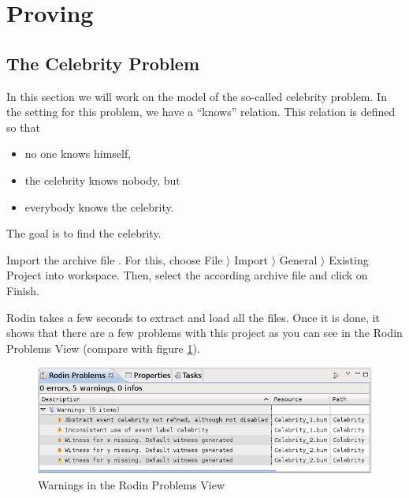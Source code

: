 \section{Proving}
\label{tutorial_08}


\subsection{The Celebrity Problem}

In this section we will work on the model of the so-called celebrity problem. In the setting for this problem, we have a ``knows'' relation. This relation is defined so that

\begin{itemize}
	\item no one knows himself,
	\item the celebrity knows nobody, but
	\item everybody knows the celebrity.
\end{itemize}    

The goal is to find the celebrity.


Import the archive file . For this, choose \textsf{File $\rangle $ Import $\rangle $ General $\rangle $ Existing Project into workspace}. Then, select the according archive file and click on \textsf{Finish}.

Rodin takes a few seconds to extract and load all the files. Once it is done, it shows that there are a few problems with this project as you can see in the Rodin Problems View (compare with figure \ref{fig_tut_08_rodin_problemview}).

\begin{figure}[!h]
\begin{center}
	\includegraphics{img/tutorial/tut_08_rodin_problems.png}
	\caption{Warnings in the Rodin Problems View}
	\label{fig_tut_08_rodin_problemview}
\end{center}
\end{figure}

